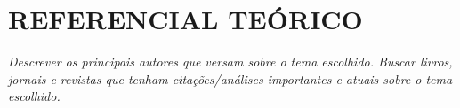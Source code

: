 \chapter{REFERENCIAL TEÓRICO}

\textit{Descrever os principais autores que versam sobre o tema escolhido. Buscar livros, jornais e revistas que tenham citações/análises importantes e atuais sobre o tema escolhido.}